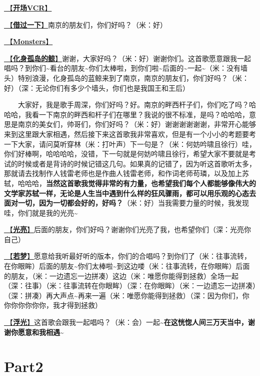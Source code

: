 \documentclass[]{ctexbook}
\begin{document}
\hyperref[opening-vcr]{🎥【\textbf{开场VCR}】}

\hyperref[I-will-go-my-way]{🎵【\textbf{借过一下}】}南京的朋友们，你们好吗？（米：好）

\hyperref[Monsters]{🎵【\textbf{Monsters}】}

\hyperref[hua-shen-gu-dao-de-jing]{🎵【\textbf{化身孤岛的鲸}】}谢谢，大家好吗？（米：好）谢谢你们。这首歌愿意跟我一起唱吗？到你们\textasciitilde 看台的朋友\textasciitilde 你们太棒啦，到你们啦\textasciitilde 后面的\textasciitilde 一起\textasciitilde（米：没有墙头）特别浪漫，化身孤岛的蓝鲸来到了南京，南京的朋友们，你们好吗？（米：好）（深：无论你们有多少个墙头，你们也是我国王和王后）

  大家好，我是歌手周深，你们好吗？好。南京的畔西杆子们，你们吃了吗？哈哈哈，我看一下南京的畔西和杆子们在哪里？我说的很不标准，是吗？哈哈哈，意思是南京的美女们，帅哥们，你们好吗？（米：好）谢谢谢谢谢谢，非常开心能够来到这里跟大家相遇，然后接下来这首歌我非常喜欢，但是有一个小小的考题要考一下大家，请问莫听穿林（米：打叶声）下一句是？（米：何妨吟啸且徐行）哇，你们好棒啊，哈哈哈哈，没错，下一句就是何妨吟啸且徐行，希望大家不要就是考试的时候或者是背诗的时候记错这几句。如果真的记错了，因为听这首歌听太多，那就请去找制作人钱雷老师也是作曲人钱雷老师，和作词老师苟璘，以及加上苏轼，哈哈哈，\textbf{当然这首歌我觉得非常的有力量，也希望我们每个人都能够像伟大的文学家苏轼一样，无论是人生当中遇到什么样的狂风骤雨，都可以用乐观的心态去面对一切，因为一切都会好的，好吗？}（米：好）当我需要力量的时候，我发现哇，你们就是我的光亮\textasciitilde{}

\hyperref[silver-linings]{🎵【\textbf{光亮}】}后面的朋友，你们好吗？谢谢你们光亮了我，也希望你们（深：光亮你自己）

\hyperref[ruomeng]{🎵【\textbf{若梦}】}愿意给我听最好听的版本，你们的合唱吗？到你们了（米：往事流转，在你眼眸）后面的朋友\textasciitilde 你们太棒啦\textasciitilde 到这边喽（米：往事流转，在你眼眸）后面的朋友，（米：一边遗忘一边拼凑）这边（米：唯愿你能得到拯救）全场一起（深：往事）（米：往事流转在你眼眸）（深：在你眼眸）（米：一边遗忘一边拼凑）（深：拼凑）再大声点\textasciitilde 再来一遍（米：唯愿你能得到拯救）（深：因为你们，你你你你你你你，我才得到拯救）

\hyperref[floating-light]{🎵【\textbf{浮光}】}这首歌会跟我一起唱吗？（米：会）一起\textasciitilde{}\textbf{在这恍惚人间三万天当中，谢谢你愿意和我相遇\textasciitilde{}}

\section{Part2}\label{nanjing-20240810-part2}
\end{document}
